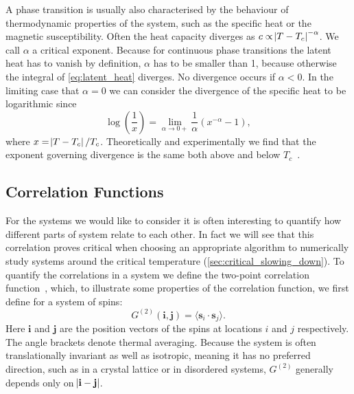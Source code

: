 \documentclass[11pt, a4paper]{report} %
\begin{document}
A phase transition is usually also characterised by the behaviour of thermodynamic properties of the system, such as the specific heat or the magnetic susceptibility.
Often the heat capacity diverges as \(c \propto \abs{T-T_c}^{-\alpha}\).
We call \(\alpha\) a critical exponent.
Because for continuous phase transitions the latent heat has to vanish by definition, \(\alpha\) has to be smaller than 1, because otherwise the integral of \cref{eq:latent_heat} diverges.
No divergence occurs if \(\alpha < 0\).
In the limiting case that \(\alpha = 0\) we can consider the divergence of the specific heat to be logarithmic since
\begin{equation}
	\log(\frac{1}{x}) = \lim_{\alpha \to 0+} \frac{1}{\alpha}\left(x^{-\alpha} - 1\right),
\end{equation}
where \(x = \abs{T - T_c}/T_c\).
Theoretically and experimentally we find that the exponent governing divergence is the same both above and below \(T_c\)~\cite{binney:1992}.

\subsection{Correlation Functions}
For the systems we would like to consider it is often interesting to quantify how different parts of system relate to each other.
In fact we will see that this correlation proves critical when choosing an appropriate algorithm to numerically study systems around the critical temperature (\cref{sec:critical_slowing_down}).
To quantify the correlations in a system we define the two-point correlation function~\cite{binney:1992}, which, to illustrate some properties of the correlation function, we first define for a system of spins:
\begin{equation}
	G^{(2)}(\mathbf{i}, \mathbf{j}) = \langle{\mathbf{s}_i \cdot \mathbf{s}_j}\rangle.
\end{equation}
Here \(\mathbf{i}\) and \(\mathbf{j}\) are the position vectors of the spins at locations \(i\) and \(j\) respectively.
The angle brackets denote thermal averaging.
Because the system is often translationally invariant as well as isotropic, meaning it has no preferred direction, such as in a crystal lattice or in disordered systems, \(G^{(2)}\) generally depends only on \(\abs{\mathbf{i} - \mathbf{j}} \).
\end{document}
